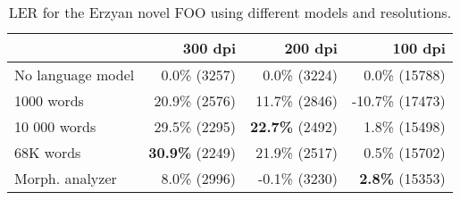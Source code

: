 \documentclass[b5paper]{article}
\begin{document}

\begin{table}[!htb]
\begin{center}
\begin{tabular}{lrrr}
\hline 
                  & 300 dpi & 200 dpi & 100 dpi \\
\hline 
No language model &  0.0\% (3257)  &  0.0\% (3224)  &  0.0\% (15788)  \\
1000 words        &  20.9\% (2576)  &  11.7\% (2846)  & -10.7\%  (17473) \\
10 000 words      &  29.5\% (2295)  &   {\bf 22.7\%} (2492)  & 1.8\% (15498)  \\
68K words         &  {\bf 30.9\%} (2249)  &  21.9\% (2517)  & 0.5\% (15702)\\
Morph. analyzer   &  8.0\% (2996)  &  -0.1\% (3230)  & {\bf 2.8\%} (15353)  \\
\hline 
\end{tabular}
\caption{LER for the Erzyan novel FOO using different models and resolutions.}\label{fin-news-res}
\end{center}
\end{table}
\end{document}
